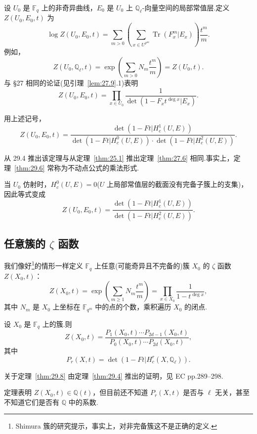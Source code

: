 设 $U_0$ 是 $\mathbb{F}_q$ 上的非奇异曲线，$E_0$ 是 $U_0$ 上 $\mathbb{Q}_{\ell}$-向量空间的局部常值层.定义 $Z(U_0, E_0, t)$ 为
\[
\log Z(U_0, E_0, t) = \sum_{m > 0} \left( \sum_{x \in U^{F^{m}}} \operatorname{Tr}(F^{m}_x|E_x) \right) \frac{t^{m}}{m}.
\]
例如，
\[
Z(U_0, \mathbb{Q}_{\ell}, t) = \exp\left( \sum_{m > 0} N_m \frac{t^{m}}{m} \right) = Z(U_0, t).
\]
与 \S 27 相同的论证(见引理~\ref{lem:27.9}.1)表明
\[
Z(U_0, E_0, t) = \prod_{x \in U_0} \frac{1}{\det(1 - F_x t^{\deg x}|E_x)}.
\]

\begin{theorem}\label{thm:29.6}
用上述记号，
\[
Z(U_0, E_0, t) = \frac{\det(1 - Ft|H^{1}_{c}(U, E))}{\det(1 - Ft|H^{0}_{c}(U, E)) \cdot \det(1 - Ft|H^{2}_{c}(U, E))}.
\]
\end{theorem}

从 29.4 推出该定理与从定理~\ref{thm:25.1} 推出定理~\ref{thm:27.6} 相同.事实上，定理~\ref{thm:29.6} 常称为不动点公式的乘法形式.

\begin{remark}\label{rem:29.7}
当 $U_0$ 仿射时，$H^{0}_{c}(U, E) = 0$($U$ 上局部常值层的截面没有完备子簇上的支集)，因此等式变成
\[
Z(U_0, E_0, t) = \frac{\det(1 - Ft|H^{1}_{c}(U, E))}{\det(1 - Ft|H^{2}_{c}(U, E))}.
\]
\end{remark}

\subsection*{\texorpdfstring{任意簇的 $\zeta$ 函数}{任意簇的 zeta 函数}}

我们像好\footnote{Shimura 簇的研究提示，事实上，对非完备簇这不是正确的定义.}的情形一样定义 $\mathbb{F}_q$ 上任意(可能奇异且不完备的)簇 $X_0$ 的 $\zeta$ 函数 $Z(X_0, t)$：
\[
Z(X_0, t) = \exp\left( \sum_{m \geq 1} N_m \frac{t^{m}}{m} \right) = \prod_{x \in X_0} \frac{1}{1 - t^{\deg x}},
\]
其中 $N_m$ 是 $X_0$ 上坐标在 $\mathbb{F}_{q^m}$ 中的点的个数，乘积遍历 $X_0$ 的闭点.

\begin{theorem}\label{thm:29.8}
设 $X_0$ 是 $\mathbb{F}_q$ 上的簇.则
\[
Z(X_0, t) = \frac{P_1(X_0, t) \cdots P_{2d-1}(X_0, t)}{P_0(X_0, t) \cdots P_{2d}(X_0, t)},
\]
其中
\[
P_r(X, t) = \det(1 - Ft|H^{r}_{c}(X, \mathbb{Q}_{\ell})).
\]
\end{theorem}

关于定理~\ref{thm:29.8} 由定理~\ref{thm:29.4} 推出的证明，见 EC pp.289--298.

定理表明 $Z(X_0, t) \in \mathbb{Q}(t)$，但目前还不知道 $P_r(X, t)$ 是否与 $\ell$ 无关，甚至不知道它们是否有 $\mathbb{Q}$ 中的系数.

